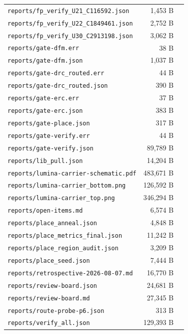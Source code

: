 \documentclass[11pt,a4paper]{article}
\begin{document}
{\begin{longtable}{p{9cm}rp{4cm}}
\texttt{reports/fp\_verify\_U21\_C116592.json} & 1,453 B &  \\
\texttt{reports/fp\_verify\_U22\_C1849461.json} & 2,752 B &  \\
\texttt{reports/fp\_verify\_U30\_C2913198.json} & 3,062 B &  \\
\texttt{reports/gate-dfm.err} & 38 B &  \\
\texttt{reports/gate-dfm.json} & 1,037 B &  \\
\texttt{reports/gate-drc\_routed.err} & 44 B &  \\
\texttt{reports/gate-drc\_routed.json} & 390 B &  \\
\texttt{reports/gate-erc.err} & 37 B &  \\
\texttt{reports/gate-erc.json} & 383 B &  \\
\texttt{reports/gate-place.json} & 317 B &  \\
\texttt{reports/gate-verify.err} & 44 B &  \\
\texttt{reports/gate-verify.json} & 89,789 B &  \\
\texttt{reports/lib\_pull.json} & 14,204 B &  \\
\texttt{reports/lumina-carrier-schematic.pdf} & 483,671 B &  \\
\texttt{reports/lumina-carrier\_bottom.png} & 126,592 B &  \\
\texttt{reports/lumina-carrier\_top.png} & 346,294 B &  \\
\texttt{reports/open-items.md} & 6,574 B &  \\
\texttt{reports/place\_anneal.json} & 4,848 B &  \\
\texttt{reports/place\_metrics\_final.json} & 11,242 B &  \\
\texttt{reports/place\_region\_audit.json} & 3,209 B &  \\
\texttt{reports/place\_seed.json} & 7,444 B &  \\
\texttt{reports/retrospective-2026-08-07.md} & 16,770 B &  \\
\texttt{reports/review-board.json} & 24,681 B &  \\
\texttt{reports/review-board.md} & 27,345 B &  \\
\texttt{reports/route-probe-p6.json} & 313 B &  \\
\texttt{reports/verify\_all.json} & 129,393 B &  \\
\bottomrule
\end{longtable}
}
\end{document}
